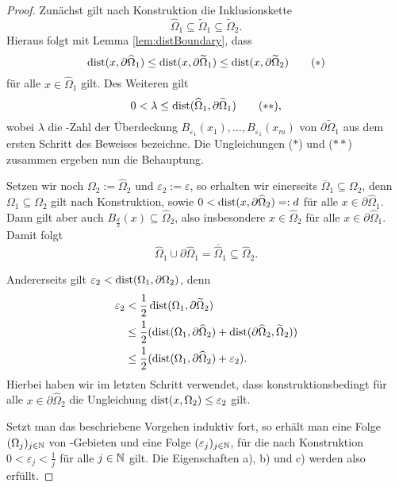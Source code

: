 \begin{proof}
  Zunächst gilt nach Konstruktion die Inklusionskette
  $$
  \widehat\Omega_1 \subseteq \widetilde\Omega_1 \subseteq \widetilde\Omega_2.
  $$
  Hieraus folgt mit Lemma \ref{lem:distBoundary}, dass
  \begin{displaymath}
    \operatorname{dist}(x,\partial\widehat\Omega_1) 
    \leq \operatorname{dist}(x,\partial\widetilde\Omega_1) 
    \leq \operatorname{dist}(x,\partial\widetilde\Omega_2) \tag{$\ast$}
  \end{displaymath}
  für alle $x \in \widehat\Omega_1$ gilt.
  Des Weiteren gilt 
  \begin{displaymath}
  0 < \lambda \leq \operatorname{dist}(\widehat\Omega_1,\partial\widetilde\Omega_1) \tag{$\ast\ast$},
  \end{displaymath}
  wobei $\lambda$ die \lebesgue\hyp{}Zahl der Überdeckung $B_{\varepsilon_1}(x_1),\dots,B_{\varepsilon_1}(x_m)$ von $\partial\widetilde\Omega_1$ aus dem ersten Schritt des Beweises bezeichne.
  Die Ungleichungen ($\ast$) und ($\ast\ast$) zusammen ergeben nun die Behauptung.

  Setzen wir noch $\Omega_2 := \widehat\Omega_2$ und $\varepsilon_2 := \varepsilon$, so erhalten wir einerseits $\overline\Omega_1 \subseteq \Omega_2$, denn $\Omega_1 \subseteq \Omega_2$ gilt nach Konstruktion, sowie $0 < \operatorname{dist}(x,\partial\widehat\Omega_2) =: d$ für alle $x \in \partial\widehat\Omega_1$. Dann gilt aber auch $B_{\frac{d}{2}}(x) \subseteq \widehat\Omega_2$, also insbesondere $x \in \widehat\Omega_2$ für alle $x \in \partial\widehat\Omega_1$. Damit folgt 
  $$
  \widehat\Omega_1 \cup \partial\widehat\Omega_1 = \overline{\widehat\Omega}_1 \subseteq \widehat\Omega_2.
  $$

  Andererseits gilt $\varepsilon_2 < \operatorname{dist}(\Omega_1, \partial\Omega_2)$, denn
  \begin{align*}
  \varepsilon_2 
  &< \frac{1}{2} \operatorname{dist}(\Omega_1, \partial\widetilde\Omega_2) \\
  & \leq \frac{1}{2} (\operatorname{dist}(\Omega_1, \partial\widehat\Omega_2) + \operatorname{dist}(\partial\widehat\Omega_2, \widetilde\Omega_2)) \\
  & \leq \frac{1}{2} (\operatorname{dist}(\Omega_1, \partial\widehat\Omega_2) + \varepsilon_2).
  \end{align*}
  Hierbei haben wir im letzten Schritt verwendet, dass konstruktionsbedingt für alle $x \in \partial \widehat\Omega_2$ die Ungleichung $\operatorname{dist}(x, \Omega_2) \leq \varepsilon_2$ gilt.

  Setzt man das beschriebene Vorgehen induktiv fort, so erhält man eine Folge $(\Omega_j)_{j \in \mathbb{N}}$ von \lipschitz\hyp{}Gebieten und eine Folge $(\varepsilon_j)_{j \in \mathbb{N}}$, für die nach Konstruktion $0 < \varepsilon_j < \tfrac{1}{j}$ für alle $j \in \mathbb{N}$ gilt.
  Die Eigenschaften a), b) und c) werden also erfüllt.


\end{proof}
